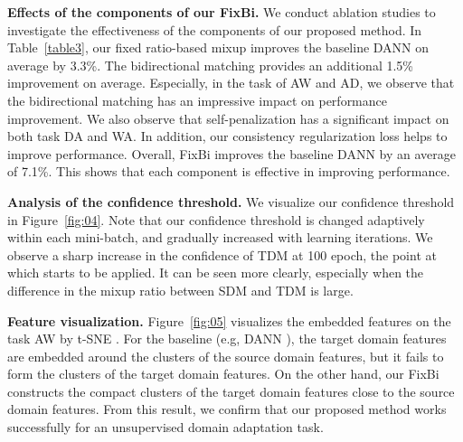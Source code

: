 \documentclass[final]{cvpr}
\begin{document}
\textbf{Effects of the components of our FixBi.} We conduct ablation studies to investigate the effectiveness of the components of our proposed method. In Table~\ref{table3}, our fixed ratio-based mixup improves the baseline DANN \cite{Ganin2015} on average by 3.3\%. The bidirectional matching provides an additional 1.5\% improvement on average. Especially, in the task of AW and AD, we observe that the bidirectional matching has an impressive impact on performance improvement. We also observe that self-penalization has a significant impact on both task DA and WA. In addition, our consistency regularization loss helps to improve performance. Overall, FixBi improves the baseline DANN by an average of 7.1\%. This shows that each component is effective in improving performance.

\textbf{Analysis of the confidence threshold.} We visualize our confidence threshold  in Figure~\ref{fig:04}. Note that our confidence threshold  is changed adaptively within each mini-batch, and gradually increased with learning iterations. We observe a sharp increase in the confidence of TDM at 100 epoch, the point at which  starts to be applied. It can be seen more clearly, especially when the difference in the mixup ratio between SDM and TDM is large.

\textbf{Feature visualization.} Figure~\ref{fig:05} visualizes the embedded features on the task AW by t-SNE \cite{tSNE}. For the baseline (e.g, DANN \cite{Ganin2015}), the target domain features are embedded around the clusters of the source domain features, but it fails to form the clusters of the target domain features. On the other hand, our FixBi constructs the compact clusters of the target domain features close to the source domain features. From this result, we confirm that our proposed method works successfully for an unsupervised domain adaptation task.
\end{document}
